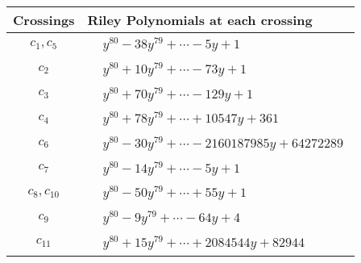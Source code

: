 \documentclass[1p]{elsarticle_modified}
\theoremstyle{definition}
\begin{document}
\begin{tabular}{m{50pt}|m{274pt}}
Crossings & \hspace{64pt}Riley Polynomials at each crossing \\
\hline $$\begin{aligned}c_{1},c_{5}\end{aligned}$$&$\begin{aligned}
&y^{80}-38 y^{79}+\cdots-5 y+1
\end{aligned}$\\
\hline $$\begin{aligned}c_{2}\end{aligned}$$&$\begin{aligned}
&y^{80}+10 y^{79}+\cdots-73 y+1
\end{aligned}$\\
\hline $$\begin{aligned}c_{3}\end{aligned}$$&$\begin{aligned}
&y^{80}+70 y^{79}+\cdots-129 y+1
\end{aligned}$\\
\hline $$\begin{aligned}c_{4}\end{aligned}$$&$\begin{aligned}
&y^{80}+78 y^{79}+\cdots+10547 y+361
\end{aligned}$\\
\hline $$\begin{aligned}c_{6}\end{aligned}$$&$\begin{aligned}
&y^{80}-30 y^{79}+\cdots-2160187985 y+64272289
\end{aligned}$\\
\hline $$\begin{aligned}c_{7}\end{aligned}$$&$\begin{aligned}
&y^{80}-14 y^{79}+\cdots-5 y+1
\end{aligned}$\\
\hline $$\begin{aligned}c_{8},c_{10}\end{aligned}$$&$\begin{aligned}
&y^{80}-50 y^{79}+\cdots+55 y+1
\end{aligned}$\\
\hline $$\begin{aligned}c_{9}\end{aligned}$$&$\begin{aligned}
&y^{80}-9 y^{79}+\cdots-64 y+4
\end{aligned}$\\
\hline $$\begin{aligned}c_{11}\end{aligned}$$&$\begin{aligned}
&y^{80}+15 y^{79}+\cdots+2084544 y+82944
\end{aligned}$\\
\hline
\end{tabular}\\~\\
\end{document}
